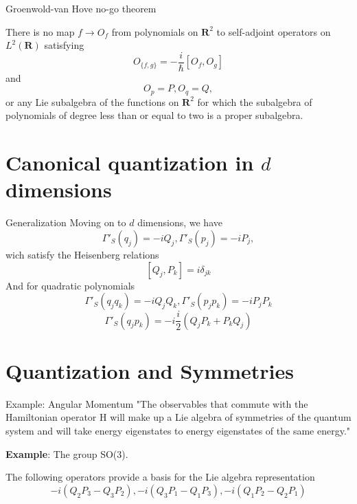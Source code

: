 \documentclass[12pt]{beamer}
\begin{document}
\begin{frame}{Groenwold-van Hove no-go theorem}
\begin{theorem}
There is no map $f \rightarrow O_{f}$ from polynomials on $\mathbf{R}^2$ to self-adjoint operators on $L^2(\mathbf{R})$ satisfying
\begin{displaymath}
  O_{\{f,g\}} = -\frac{i}{\hbar}\left[O_f, O_g\right]
\end{displaymath}
and
\begin{displaymath}
  O_{p} = P, O_q=Q,
\end{displaymath}
or any Lie subalgebra of the functions on $\mathbf{R}^2$ for which the subalgebra of polynomials of degree less than or equal to two is a proper subalgebra.

\end{theorem}
\end{frame}

\section{Canonical quantization in $d$ dimensions}
\begin{frame}{Generalization}
Moving on to $d$ dimensions, we have
\begin{displaymath}
  \Gamma'_{S}(q_j)=-iQ_j, \Gamma'_{S}(p_j)=-iP_j,
\end{displaymath}
wich satisfy the Heisenberg relations
\begin{displaymath}
  \left[ Q_j, P_k\right] = i\delta_{jk}
\end{displaymath}
And for quadratic polynomials
\begin{displaymath}
  \Gamma'_{S}(q_j q_k)= -iQ_j Q_k, \Gamma'_{S}(p_j p_k)= -iP_j P_k
\end{displaymath}
\begin{displaymath}
  \Gamma'_{S}(q_j p_k)= -i\frac{i}{2}\left(Q_jP_k+P_kQ_j\right)
\end{displaymath}
\end{frame}

\section{Quantization and Symmetries}{}
\begin{frame}{Example: Angular Momentum}
"The observables that commute with the Hamiltonian operator H will make up a Lie algebra of symmetries of the quantum system and will take energy eigenstates to energy eigenstates of the same energy."

\textbf{Example}: The group SO(3).

The following operators provide a basis for the Lie algebra representation
\begin{displaymath}
  -i\left( Q_2 P_3 -Q_3P_2\right),-i\left( Q_3 P_1 -Q_1P_3\right), -i\left( Q_1 P_2 -Q_2 P_1\right)
\end{displaymath}
\end{frame}
\end{document}
